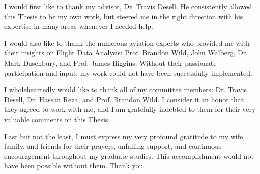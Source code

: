 
	I would first like to thank my advisor, Dr. Travis Desell.  He consistently allowed this Thesis to be my own work, but steered me in the right direction with his expertise in many areas whenever I needed help.

	I would also like to thank the numerous aviation experts who provided me with their insights on Flight Data Analysis:  Prof. Brandon Wild, John Walberg, Dr. Mark Dusenbury, and Prof. James Higgins.  Without their passionate participation and input, my work could not have been successfully implemented.
	
	I wholeheartedly would like to thank all of my committee members:  Dr. Travis Desell, Dr. Hassan Reza, and Prof. Brandon Wild.  I consider it an honor that they agreed to work with me, and I am gratefully indebted to them for their very valuable comments on this Thesis.
	
	Last but not the least, I must express my very profound gratitude to my wife, family, and friends for their prayers, unfailing support, and continuous encouragement throughout my graduate studies.  This accomplishment would not have been possible without them.  Thank you.